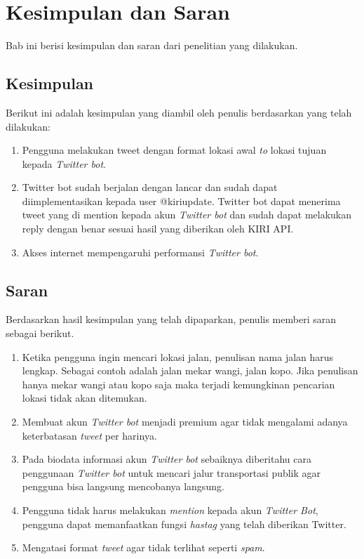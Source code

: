 \chapter{Kesimpulan dan Saran}
\label{chap:kesimpulan dan saran}

Bab ini berisi kesimpulan dan saran dari penelitian yang dilakukan.

\section{Kesimpulan}
Berikut ini adalah kesimpulan yang diambil oleh penulis berdasarkan yang telah dilakukan:

\begin{enumerate}
	\item Pengguna melakukan tweet dengan format lokasi awal \textit{to} lokasi tujuan kepada \textit{Twitter bot}.
	\item Twitter bot sudah berjalan dengan lancar dan sudah dapat diimplementasikan kepada user @kiriupdate. Twitter bot dapat menerima tweet yang di mention kepada akun \textit{Twitter bot} dan sudah dapat melakukan reply dengan benar sesuai hasil yang diberikan oleh KIRI API.
	\item Akses internet mempengaruhi performansi \textit{Twitter bot}.
\end{enumerate}

\section{Saran}
Berdasarkan hasil kesimpulan yang telah dipaparkan, penulis memberi saran sebagai berikut.

\begin{enumerate}
	\item Ketika pengguna ingin mencari lokasi jalan, penulisan nama jalan harus lengkap. Sebagai contoh adalah jalan mekar wangi, jalan kopo. Jika penulisan hanya mekar wangi atau kopo saja maka terjadi kemungkinan pencarian lokasi tidak akan ditemukan.
	\item Membuat akun \textit{Twitter bot} menjadi premium agar tidak mengalami adanya keterbatasan \textit{tweet} per harinya.
	\item Pada biodata informasi akun \textit{Twitter bot} sebaiknya diberitahu cara penggunaan \textit{Twitter bot} untuk mencari jalur transportasi publik agar pengguna bisa langsung mencobanya langsung.
	\item Pengguna tidak harus melakukan \textit{mention} kepada akun \textit{Twitter Bot}, pengguna dapat memanfaatkan fungsi \textit{hastag} yang telah diberikan Twitter.
	\item Mengatasi format \textit{tweet} agar tidak terlihat seperti \textit{spam}.
\end{enumerate}